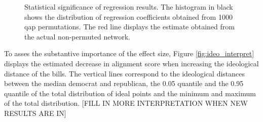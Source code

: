 \documentclass[12pt]{article} %
\begin{document}
\begin{figure}[ht!]
\caption{Statistical significance of regression results. The histogram in black shows the distribution of regression coefficients obtained from 1000 qap permutations. The red line displays the estimate obtained from the actual non-permuted network.}
\label{fig:qap_dist}
\end{figure}

To asses the substantive importance of the effect size, Figure \ref{fig:ideo_interpret} displays the estimated decrease in alignment score when increasing the ideological distance of the bills. The vertical lines correspond to the ideological distances between the median democrat and republican, the 0.05 quantile and the 0.95 quantile of the total distribution of ideal points and the minimum and maximum of the total distribution. [FILL IN MORE INTERPRETATION WHEN NEW RESULTS ARE IN] 
\end{document}
